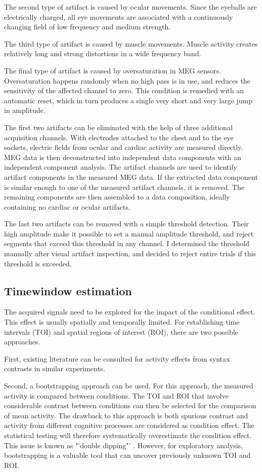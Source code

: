 The second type of artifact is caused by ocular movements.
Since the eyeballs are electrically charged, all eye movements are associated with a continuously changing field of low frequency and medium strength.

The third type of artifact is caused by muscle movements.
Muscle activity creates relatively long and strong distortions in a wide frequency band.

The final type of artifact is caused by oversaturation in MEG sensors.
Oversaturation happens randomly when no high pass is in use, and reduces the sensitivity of the affected channel to zero.
This condition is remedied with an automatic reset, which in turn produces a single very short and very large jump in amplitude.

The first two artifacts can be eliminated with the help of three additional acquisition channels.
With electrodes attached to the chest and to the eye sockets, electric fields from ocular and cardiac activity are measured directly.
MEG data is then deconstructed into independent data components with an independent component analysis.
The artifact channels are used to identify artifact components in the measured MEG data.
If the extracted data component is similar enough to one of the measured artifact channels, it is removed. 
The remaining components are then assembled to a data composition, ideally containing no cardiac or ocular artifacts.

The last two artifacts can be removed with a simple threshold detection.
Their high amplitude make it possible to set a manual amplitude threshold, and reject segments that exceed this threshold in any channel.
I determined the threshold manually after visual artifact inspection, and decided to reject entire trials if this threshold is exceeded.

\subsection{Timewindow estimation}
The acquired signals need to be explored for the impact of the conditional effect.
This effect is usually spatially and temporally limited.
For establishing time intervals (TOI) and spatial regions of interest (ROI), there are two possible approaches.

First, existing literature can be consulted for activity effects from syntax contrasts in similar experiments.

Second, a bootstrapping approach can be used.
For this approach, the measured activity is compared between conditions.
The TOI and ROI that involve considerable contrast between conditions can then be selected for the comparison of mean activity.
The drawback to this approach is both spurious contrast and activity from different cognitive processes are considered as condition effect.
The statistical testing will therefore systematically overestimate the condition effect.
This issue is known as "'double dipping"' \cite{1.5.Kriegeskorte}.
However, for exploratory analysis, bootstrapping is a valuable tool that can uncover previously unknown TOI and ROI.

